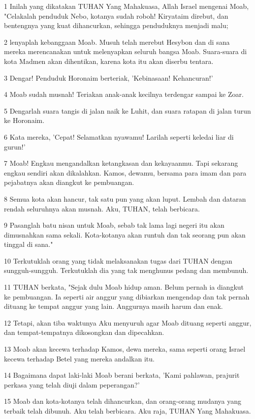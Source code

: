 \par 1 Inilah yang dikatakan TUHAN Yang Mahakuasa, Allah Israel mengenai Moab, "Celakalah penduduk Nebo, kotanya sudah roboh! Kiryataim direbut, dan bentengnya yang kuat dihancurkan, sehingga penduduknya menjadi malu;
\par 2 lenyaplah kebanggaan Moab. Musuh telah merebut Hesybon dan di sana mereka merencanakan untuk melenyapkan seluruh bangsa Moab. Suara-suara di kota Madmen akan dihentikan, karena kota itu akan diserbu tentara.
\par 3 Dengar! Penduduk Horonaim berteriak, 'Kebinasaan! Kehancuran!'
\par 4 Moab sudah musnah! Teriakan anak-anak kecilnya terdengar sampai ke Zoar.
\par 5 Dengarlah suara tangis di jalan naik ke Luhit, dan suara ratapan di jalan turun ke Horonaim.
\par 6 Kata mereka, 'Cepat! Selamatkan nyawamu! Larilah seperti keledai liar di gurun!'
\par 7 Moab! Engkau mengandalkan ketangkasan dan kekayaanmu. Tapi sekarang engkau sendiri akan dikalahkan. Kamos, dewamu, bersama para imam dan para pejabatnya akan diangkut ke pembuangan.
\par 8 Semua kota akan hancur, tak satu pun yang akan luput. Lembah dan dataran rendah seluruhnya akan musnah. Aku, TUHAN, telah berbicara.
\par 9 Pasanglah batu nisan untuk Moab, sebab tak lama lagi negeri itu akan dimusnahkan sama sekali. Kota-kotanya akan runtuh dan tak seorang pun akan tinggal di sana."
\par 10 Terkutuklah orang yang tidak melaksanakan tugas dari TUHAN dengan sungguh-sungguh. Terkutuklah dia yang tak menghunus pedang dan membunuh.
\par 11 TUHAN berkata, "Sejak dulu Moab hidup aman. Belum pernah ia diangkut ke pembuangan. Ia seperti air anggur yang dibiarkan mengendap dan tak pernah dituang ke tempat anggur yang lain. Anggurnya masih harum dan enak.
\par 12 Tetapi, akan tiba waktunya Aku menyuruh agar Moab dituang seperti anggur, dan tempat-tempatnya dikosongkan dan dipecahkan.
\par 13 Moab akan kecewa terhadap Kamos, dewa mereka, sama seperti orang Israel kecewa terhadap Betel yang mereka andalkan itu.
\par 14 Bagaimana dapat laki-laki Moab berani berkata, 'Kami pahlawan, prajurit perkasa yang telah diuji dalam peperangan?'
\par 15 Moab dan kota-kotanya telah dihancurkan, dan orang-orang mudanya yang terbaik telah dibunuh. Aku telah berbicara. Aku raja, TUHAN Yang Mahakuasa.
